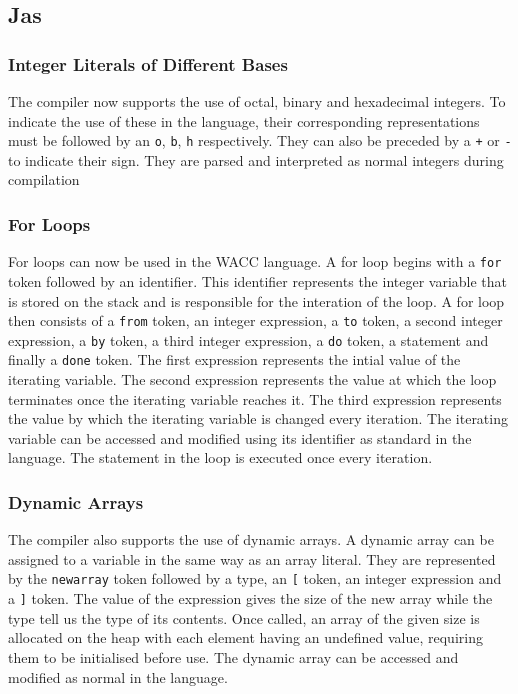\documentclass[]{article}
\begin{document}
\subsection{Jas}
\subsubsection{Integer Literals of Different Bases} {The compiler now supports the use of octal, binary and hexadecimal integers. To indicate the use of these in the language, their corresponding representations must be followed by an {\tt o}, {\tt b}, {\tt h} respectively. They can also be preceded by a {\tt +} or {\tt -} to indicate their sign. They are parsed and interpreted as normal integers during compilation}
\subsubsection{For Loops} {For loops can now be used in the WACC language. A for loop begins with a {\tt for} token followed by an identifier. This identifier represents the integer variable that is stored on the stack and is responsible for the interation of the loop. A for loop then consists of a {\tt from} token, an integer expression, a {\tt to} token, a second integer expression, a {\tt by} token, a third integer expression, a {\tt do} token, a statement and finally a {\tt done} token. The first expression represents the intial value of the iterating variable. The second expression represents the value at which the loop terminates once the iterating variable reaches it. The third expression represents the value by which the iterating variable is changed every iteration. The iterating variable can be accessed and modified using its identifier as standard in the language. The statement in the loop is executed once every iteration.}
\subsubsection{Dynamic Arrays} { The compiler also supports the use of dynamic arrays. A dynamic array can be assigned to a variable in the same way as an array literal. They are represented by the {\tt newarray} token followed by a type, an {\tt [} token, an integer expression and a {\tt ]} token. The value of the expression gives the size of the new array while the type tell us the type of its contents. Once called, an array of the given size is allocated on the heap with each element having an undefined value, requiring them to be initialised before use. The dynamic array can be accessed and modified as normal in the language.}
\end{document}
